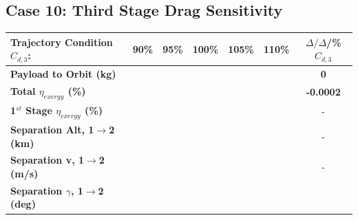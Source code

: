 \subsection{Case 10: Third Stage Drag Sensitivity}

\begin{table}[ht] %
	\centering
	\begin{tabular}{l c c c c c c} 
		\hline \textbf{Trajectory Condition}   \qquad  $C_{d,3}$:
		&90\%
		&95\%
		&100\%
		&105\%
		&110\%
		& $\Delta/\Delta$/\%$C_{d,3}$
			\\
			\hline \textbf{Payload to Orbit (kg)}
			& \textbf{\PayloadToOrbitCdThreeNinetyNoReturn}
			& \textbf{\PayloadToOrbitCdThreeNinetyFiveNoReturn}
			& \textbf{\PayloadToOrbitCdThreeStandardNoReturn}
			& \textbf{\PayloadToOrbitCdThreeOneOneHundredFiveNoReturn}
			& \textbf{\PayloadToOrbitCdThreeOneHundredTenNoReturn}
			& \textbf{0}
			\\
			\textbf{Total $\eta_{exergy}$ (\%)}
			& \textbf{\totalExergyEffCdThreeNinetyNoReturn}
			& \textbf{\totalExergyEffCdThreeNinetyFiveNoReturn}
			& \textbf{\totalExergyEffCdThreeStandardNoReturn}
			& \textbf{\totalExergyEffCdThreeOneOneHundredFiveNoReturn}
			& \textbf{\totalExergyEffCdThreeOneHundredTenNoReturn}
			& \textbf{-0.0002}
			\\
			\hline 
			\textbf{1$^{st}$ Stage $\eta_{exergy}$ (\%)}
			& \textbf{\firstExergyEffCdThreeNinetyNoReturn}
			& \textbf{\firstExergyEffCdThreeNinetyFiveNoReturn}
			& \textbf{\firstExergyEffCdThreeStandardNoReturn}
			& \textbf{\firstExergyEffCdThreeOneOneHundredFiveNoReturn}
			& \textbf{\firstExergyEffCdThreeOneHundredTenNoReturn}
			& -
			\\
			\textbf{Separation Alt, 1$\rightarrow$2 (km)}
			& \firstsecondSeparationAltCdThreeNinetyNoReturn
			& \firstsecondSeparationAltCdThreeNinetyFiveNoReturn
			& \firstsecondSeparationAltCdThreeStandardNoReturn
			& \firstsecondSeparationAltCdThreeOneOneHundredFiveNoReturn
			& \firstsecondSeparationAltCdThreeOneHundredTenNoReturn
			& -
			\\
			\textbf{Separation v, 1$\rightarrow$2 (m/s)}
			& \firstsecondSeparationvCdThreeNinetyNoReturn
			& \firstsecondSeparationvCdThreeNinetyFiveNoReturn
			& \firstsecondSeparationvCdThreeStandardNoReturn
			& \firstsecondSeparationvCdThreeOneOneHundredFiveNoReturn
			& \firstsecondSeparationvCdThreeOneHundredTenNoReturn
			& -
			\\
			\textbf{Separation $\gamma$, 1$\rightarrow$2 (deg)}
			& \firstsecondSeparationgammaCdThreeNinetyNoReturn

\end{tabular}
\end{table}
